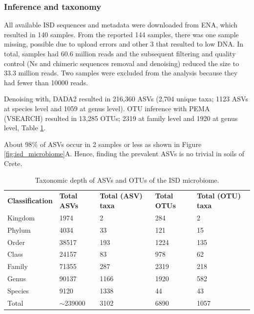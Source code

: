 \documentclass[a4paper,12pt]{article}
\begin{document}
\subsubsection{Inference and taxonomy}

All available ISD sequences and metadata were downloaded from ENA, which resulted in 140 samples. 
From the reported 144 samples, there was one sample missing, possible due to upload errors and other 3 that resulted to low DNA.
In total, samples had 60.6 million reads and the subsequent filtering and quality control (Ns and chimeric sequences removal and denoising)
reduced the size to 33.3 million reads. Two samples were excluded from the analysis because they had
fewer than 10000 reads. 

Denoising with, DADA2 resulted in 216,360 ASVs (2,704 unique
taxa; 1123 ASVs at species level and 1059 at genus level). OTU inference with
PEMA (VSEARCH) resulted in 13,285 OTUs; 2319 at family level and 1920 at genus level, Table \ref{table:asv_taxonomy}.


About 98\% of ASVs occur in 2 samples or less as shown in Figure \ref{fig:isd_microbiome}A.
Hence, finding the prevalent ASVs is no trivial in soils of Crete.

\begin{table}[]
    \caption{Taxonomic depth of ASVs and OTUs of the ISD microbiome.}%
\begin{tabular}{@{}lllll@{}}
    \textbf{Classification} & \textbf{Total ASVs}    & \textbf{Total (ASV) taxa} & \textbf{Total OTUs} & \textbf{Total (OTU) taxa}\\
Kingdom              & 1974         & 2                & 284        & 2               \\
Phylum               & 4034         & 33               & 121        & 15              \\
Order                & 38517        & 193              & 1224       & 135             \\
Class                & 24157        & 83               & 978        & 62              \\
Family               & 71355        & 287              & 2319       & 218             \\
Genus                & 90137        & 1166             & 1920       & 582             \\
Species              & 9120         & 1338             & 44         & 43              \\
Total                & $\sim$239000 & 3102             & 6890       & 1057            
\end{tabular}
\label{table:asv_taxonomy}
\end{table}
\end{document}
